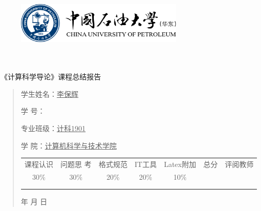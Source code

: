 \documentclass{article}
\renewcommand{\today}{\number\year 年 \number\month 月 \number\day 日}
\begin{document}
\begin{figure}
    \centering
    \includegraphics[width=8cm]{upc.png}

    \label{figupc}
\end{figure}

	\begin{center}
		\quad \\
		\quad \\
		\heiti \fontsize{45}{17} \quad \quad \quad 
		\vskip 1.5cm
		\heiti {} 《计算科学导论》课程总结报告
	\end{center}
	\vskip 2.0cm
		
	\begin{quotation}
		\doublespacing
		
        \par\setlength\parindent{7em}
		\quad 

		学生姓名：\underline{\qquad  李保辉 \qquad \qquad}

		学\hspace{0.61cm} 号：\underline{\qquad}
		
		专业班级：\underline{\qquad 计科1901 \qquad  }
		
        学\hspace{0.61cm} 院：\underline{计算机科学与技术学院}
		\vskip 2cm
		\centering
		\begin{table}[h]
            \centering 
            \begin{tabular}{|c|c|c|c|c|c|c|}
                \hline
                课程认识 & 问题思 考 & 格式规范  & IT工具  & Latex附加  & 总分 & 评阅教师 \\
                30\% & 30\% & 20\% & 20\% & 10\% &  &  \\
                \hline
                 & & & & & &\\
                & & & & & &\\
                \hline
            \end{tabular}
        \end{table}
		\vskip 2cm
		\today
	\end{quotation}
\end{document}
